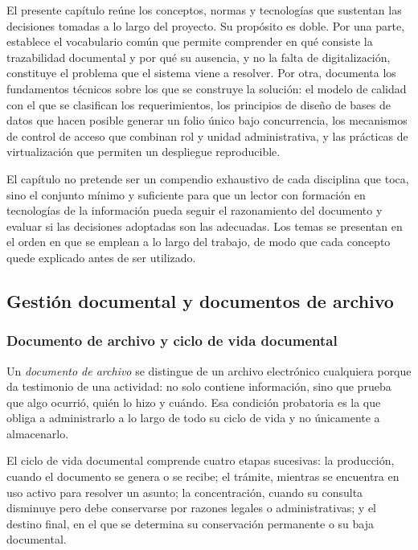 El presente capítulo reúne los conceptos, normas y tecnologías que sustentan las decisiones tomadas a lo largo del proyecto. Su propósito es doble. Por una parte, establece el vocabulario común que permite comprender en qué consiste la trazabilidad documental y por qué su ausencia, y no la falta de digitalización, constituye el problema que el sistema viene a resolver. Por otra, documenta los fundamentos técnicos sobre los que se construye la solución: el modelo de calidad con el que se clasifican los requerimientos, los principios de diseño de bases de datos que hacen posible generar un folio único bajo concurrencia, los mecanismos de control de acceso que combinan rol y unidad administrativa, y las prácticas de virtualización que permiten un despliegue reproducible.

El capítulo no pretende ser un compendio exhaustivo de cada disciplina que toca, sino el conjunto mínimo y suficiente para que un lector con formación en tecnologías de la información pueda seguir el razonamiento del documento y evaluar si las decisiones adoptadas son las adecuadas. Los temas se presentan en el orden en que se emplean a lo largo del trabajo, de modo que cada concepto quede explicado antes de ser utilizado.

\subsection{Gestión documental y documentos de archivo}
\label{subsec:mt_gestion_documental}

\subsubsection{Documento de archivo y ciclo de vida documental}

Un \emph{documento de archivo} se distingue de un archivo electrónico cualquiera porque da testimonio de una actividad: no solo contiene información, sino que prueba que algo ocurrió, quién lo hizo y cuándo. Esa condición probatoria es la que obliga a administrarlo a lo largo de todo su ciclo de vida y no únicamente a almacenarlo.

El ciclo de vida documental comprende cuatro etapas sucesivas: la producción, cuando el documento se genera o se recibe; el trámite, mientras se encuentra en uso activo para resolver un asunto; la concentración, cuando su consulta disminuye pero debe conservarse por razones legales o administrativas; y el destino final, en el que se determina su conservación permanente o su baja documental.


